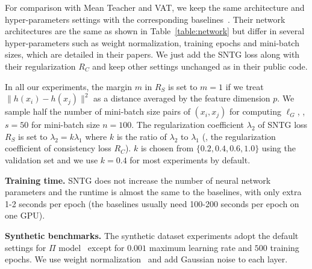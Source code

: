 \documentclass[10pt,twocolumn,letterpaper]{article}
\begin{document}
For comparison with Mean Teacher and VAT, we keep the same architecture and hyper-parameters settings with the corresponding baselines~\cite{tarvainen2017mean,miyato2017virtual}. Their network architectures are the same as shown in Table~\ref{table:network} but differ in several hyper-parameters such as weight normalization, training epochs and mini-batch sizes, which are detailed in their papers. We just add the SNTG loss along with their regularization $R_C$ and keep other settings unchanged as in their public code.

In all our experiments, the margin $m$ in $R_S$ %
is set to $m = 1$ if we treat $\|h(x_i) - h(x_j) \|^2$ as a distance averaged by the feature dimension $p$.
We sample half the number of mini-batch size pairs of $(x_i, x_j)$ for computing $\ell_G$, \eg, $s = 50$ for mini-batch size $n = 100$. The regularization coefficient $\lambda_2$ of SNTG loss $R_S$ is set to $\lambda_2 = k\lambda_1$ where $k$ is the ratio of $\lambda_2$ to $\lambda_1$ (\ie, the regularization coefficient of consistency loss $R_C$). $k$ is chosen from $\{0.2, 0.4, 0.6, 1.0\}$ using the validation set and we use $k=0.4$ for most experiments by default.

\textbf{Training time.} SNTG does not increase the number of neural network parameters and the runtime is almost the same to the baselines, with only extra 1-2 seconds per epoch (the baselines usually need 100-200 seconds per epoch on one GPU).


\textbf{Synthetic benchmarks.}
The synthetic dataset experiments adopt the default settings for $\Pi$ model~\cite{laine2016temporal} except for $0.001$ maximum learning rate and $500$ training epochs. We use weight normalization~\cite{salimans2016weight} and add Gaussian noise to each layer.
\end{document}
